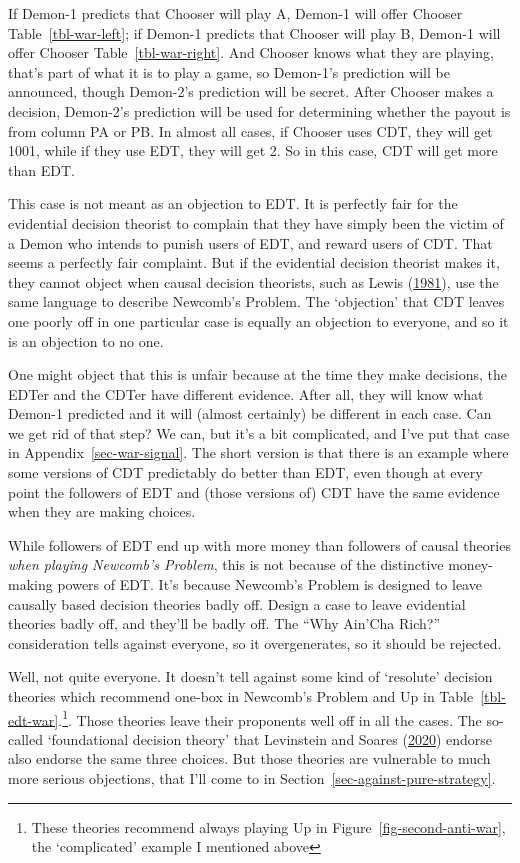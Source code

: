 \documentclass[
  12pt,
  letterpaper,
  DIV=11,
  numbers=noendperiod]{scrreprt}
\begin{document}
If Demon-1 predicts that Chooser will play A, Demon-1 will offer Chooser
Table~\ref{tbl-war-left}; if Demon-1 predicts that Chooser will play B,
Demon-1 will offer Chooser Table~\ref{tbl-war-right}. And Chooser knows
what they are playing, that's part of what it is to play a game, so
Demon-1's prediction will be announced, though Demon-2's prediction will
be secret. After Chooser makes a decision, Demon-2's prediction will be
used for determining whether the payout is from column PA or PB. In
almost all cases, if Chooser uses CDT, they will get 1001, while if they
use EDT, they will get 2. So in this case, CDT will get more than EDT.

This case is not meant as an objection to EDT. It is perfectly fair for
the evidential decision theorist to complain that they have simply been
the victim of a Demon who intends to punish users of EDT, and reward
users of CDT. That seems a perfectly fair complaint. But if the
evidential decision theorist makes it, they cannot object when causal
decision theorists, such as Lewis
(\protect\hyperlink{ref-Lewis1981e}{1981}), use the same language to
describe Newcomb's Problem. The `objection' that CDT leaves one poorly
off in one particular case is equally an objection to everyone, and so
it is an objection to no one.

One might object that this is unfair because at the time they make
decisions, the EDTer and the CDTer have different evidence. After all,
they will know what Demon-1 predicted and it will (almost certainly) be
different in each case. Can we get rid of that step? We can, but it's a
bit complicated, and I've put that case in
Appendix~\ref{sec-war-signal}. The short version is that there is an
example where some versions of CDT predictably do better than EDT, even
though at every point the followers of EDT and (those versions of) CDT
have the same evidence when they are making choices.

While followers of EDT end up with more money than followers of causal
theories \emph{when playing Newcomb's Problem}, this is not because of
the distinctive money-making powers of EDT. It's because Newcomb's
Problem is designed to leave causally based decision theories badly off.
Design a case to leave evidential theories badly off, and they'll be
badly off. The ``Why Ain'Cha Rich?'' consideration tells against
everyone, so it overgenerates, so it should be rejected.

Well, not quite everyone. It doesn't tell against some kind of
`resolute' decision theories which recommend one-box in Newcomb's
Problem and Up in Table~\ref{tbl-edt-war}.\footnote{These theories
  recommend always playing Up in Figure~\ref{fig-second-anti-war}, the
  `complicated' example I mentioned above}. Those theories leave their
proponents well off in all the cases. The so-called `foundational
decision theory' that Levinstein and Soares
(\protect\hyperlink{ref-LevinsteinSoares2020}{2020}) endorse also
endorse the same three choices. But those theories are vulnerable to
much more serious objections, that I'll come to in
Section~\ref{sec-against-pure-strategy}.
\end{document}
